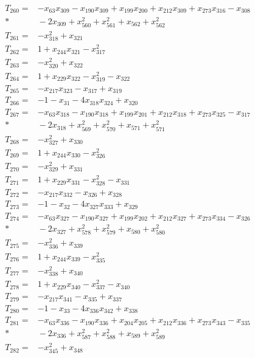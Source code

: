 \begin{align*}
T_{260}={}&-x_{63}x_{309}-x_{190}x_{309}+x_{199}x_{200}+x_{212}x_{309}+x_{273}x_{316}-x_{308}\\*
&{}-2x_{309}+x_{560}^{2}+x_{561}^{2}+x_{562}+x_{562}^{2}\\[3pt]
T_{261}={}&-x_{318}^{2}+x_{321}\\[3pt]
T_{262}={}&1+x_{244}x_{321}-x_{317}^{2}\\[3pt]
T_{263}={}&-x_{320}^{2}+x_{322}\\[3pt]
T_{264}={}&1+x_{229}x_{322}-x_{319}^{2}-x_{322}\\[3pt]
T_{265}={}&-x_{217}x_{323}-x_{317}+x_{319}\\[3pt]
T_{266}={}&-1-x_{31}-4x_{318}x_{324}+x_{320}\\[3pt]
T_{267}={}&-x_{63}x_{318}-x_{190}x_{318}+x_{199}x_{201}+x_{212}x_{318}+x_{273}x_{325}-x_{317}\\*
&{}-2x_{318}+x_{569}^{2}+x_{570}^{2}+x_{571}+x_{571}^{2}\\[3pt]
T_{268}={}&-x_{327}^{2}+x_{330}\\[3pt]
T_{269}={}&1+x_{244}x_{330}-x_{326}^{2}\\[3pt]
T_{270}={}&-x_{329}^{2}+x_{331}\\[3pt]
T_{271}={}&1+x_{229}x_{331}-x_{328}^{2}-x_{331}\\[3pt]
T_{272}={}&-x_{217}x_{332}-x_{326}+x_{328}\\[3pt]
T_{273}={}&-1-x_{32}-4x_{327}x_{333}+x_{329}\\[3pt]
T_{274}={}&-x_{63}x_{327}-x_{190}x_{327}+x_{199}x_{202}+x_{212}x_{327}+x_{273}x_{334}-x_{326}\\*
&{}-2x_{327}+x_{578}^{2}+x_{579}^{2}+x_{580}+x_{580}^{2}\\[3pt]
T_{275}={}&-x_{336}^{2}+x_{339}\\[3pt]
T_{276}={}&1+x_{244}x_{339}-x_{335}^{2}\\[3pt]
T_{277}={}&-x_{338}^{2}+x_{340}\\[3pt]
T_{278}={}&1+x_{229}x_{340}-x_{337}^{2}-x_{340}\\[3pt]
T_{279}={}&-x_{217}x_{341}-x_{335}+x_{337}\\[3pt]
T_{280}={}&-1-x_{33}-4x_{336}x_{342}+x_{338}\\[3pt]
T_{281}={}&-x_{63}x_{336}-x_{190}x_{336}+x_{204}x_{205}+x_{212}x_{336}+x_{273}x_{343}-x_{335}\\*
&{}-2x_{336}+x_{587}^{2}+x_{588}^{2}+x_{589}+x_{589}^{2}\\[3pt]
T_{282}={}&-x_{345}^{2}+x_{348}\\[3pt]

\end{align*}
